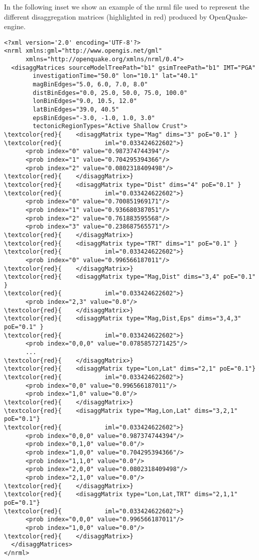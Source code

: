 In the following inset we show an example of the nrml file 
used to represent the different disaggregation matrices (highlighted 
in red) produced by OpenQuake-engine.
%
\begin{Verbatim}[frame=single, commandchars=\\\{\}, fontsize=\small]
<?xml version='2.0' encoding='UTF-8'?>
<nrml xmlns:gml="http://www.opengis.net/gml" 
      xmlns="http://openquake.org/xmlns/nrml/0.4">
  <disaggMatrices sourceModelTreePath="b1" gsimTreePath="b1" IMT="PGA" 
        investigationTime="50.0" lon="10.1" lat="40.1" 
        magBinEdges="5.0, 6.0, 7.0, 8.0" 
        distBinEdges="0.0, 25.0, 50.0, 75.0, 100.0" 
        lonBinEdges="9.0, 10.5, 12.0" 
        latBinEdges="39.0, 40.5" 
        epsBinEdges="-3.0, -1.0, 1.0, 3.0" 
        tectonicRegionTypes="Active Shallow Crust">
\textcolor{red}{    <disaggMatrix type="Mag" dims="3" poE="0.1" }
\textcolor{red}{            iml="0.033424622602">}
      <prob index="0" value="0.987374744394"/>
      <prob index="1" value="0.704295394366"/>
      <prob index="2" value="0.0802318409498"/>
\textcolor{red}{    </disaggMatrix>}
\textcolor{red}{    <disaggMatrix type="Dist" dims="4" poE="0.1" }
\textcolor{red}{            iml="0.033424622602">}
      <prob index="0" value="0.700851969171"/>
      <prob index="1" value="0.936680387051"/>
      <prob index="2" value="0.761883595568"/>
      <prob index="3" value="0.238687565571"/>
\textcolor{red}{    </disaggMatrix>}
\textcolor{red}{    <disaggMatrix type="TRT" dims="1" poE="0.1" }
\textcolor{red}{            iml="0.033424622602">}
      <prob index="0" value="0.996566187011"/>
\textcolor{red}{    </disaggMatrix>}
\textcolor{red}{    <disaggMatrix type="Mag,Dist" dims="3,4" poE="0.1" }
\textcolor{red}{            iml="0.033424622602">}
      <prob index="2,3" value="0.0"/>
\textcolor{red}{    </disaggMatrix>}
\textcolor{red}{    <disaggMatrix type="Mag,Dist,Eps" dims="3,4,3" poE="0.1" }
\textcolor{red}{            iml="0.033424622602">}
      <prob index="0,0,0" value="0.0785857271425"/>
      ...
\textcolor{red}{    </disaggMatrix>}
\textcolor{red}{    <disaggMatrix type="Lon,Lat" dims="2,1" poE="0.1"}
\textcolor{red}{            iml="0.033424622602">}
      <prob index="0,0" value="0.996566187011"/>
      <prob index="1,0" value="0.0"/>
\textcolor{red}{    </disaggMatrix>}
\textcolor{red}{    <disaggMatrix type="Mag,Lon,Lat" dims="3,2,1" poE="0.1"} 
\textcolor{red}{            iml="0.033424622602">}
      <prob index="0,0,0" value="0.987374744394"/>
      <prob index="0,1,0" value="0.0"/>
      <prob index="1,0,0" value="0.704295394366"/>
      <prob index="1,1,0" value="0.0"/>
      <prob index="2,0,0" value="0.0802318409498"/>
      <prob index="2,1,0" value="0.0"/>
\textcolor{red}{    </disaggMatrix>}
\textcolor{red}{    <disaggMatrix type="Lon,Lat,TRT" dims="2,1,1" poE="0.1"} 
\textcolor{red}{            iml="0.033424622602">}
      <prob index="0,0,0" value="0.996566187011"/>
      <prob index="1,0,0" value="0.0"/>
\textcolor{red}{    </disaggMatrix>}
  </disaggMatrices>
</nrml>

\end{Verbatim}

